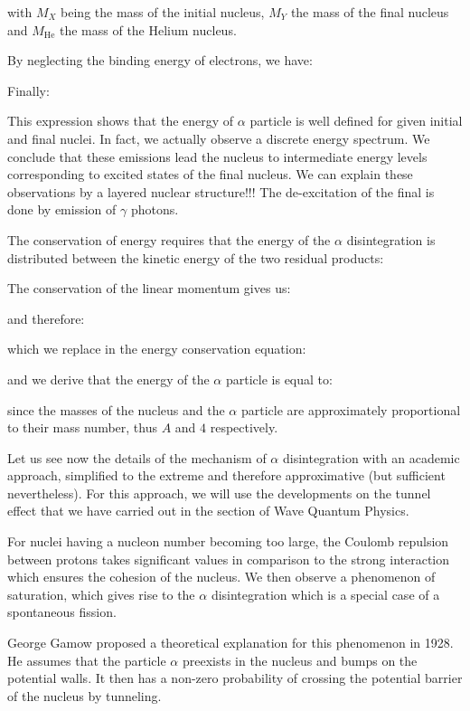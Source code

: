 	with $M_X$ being the mass of the initial nucleus, $M_Y$ the mass of the final nucleus and $M_\text{He}$ the mass of the Helium nucleus.

	By neglecting the binding energy of electrons, we have:
	
	Finally:
	
	This expression shows that the energy of $\alpha$ particle is well defined for given initial and final nuclei. In fact, we actually observe a discrete energy spectrum. We conclude that these emissions lead the nucleus to intermediate energy levels corresponding to excited states of the final nucleus. We can explain these observations by a layered nuclear structure!!! The de-excitation of the final is done by emission of $\gamma$ photons.

	The conservation of energy requires that the energy of the $\alpha$ disintegration is distributed between the kinetic energy of the two residual products:
	
	The conservation of the linear momentum gives us:
	
	and therefore:
	
	which we replace in the energy conservation equation:
	
	and we derive that the energy of the $\alpha$ particle is equal to:
	
	since the masses of the nucleus and the $\alpha$ particle are approximately proportional to their mass number, thus $A$ and $4$ respectively.
	
	Let us see now the details of the mechanism of $\alpha$ disintegration with an academic approach, simplified to the extreme and therefore approximative (but sufficient nevertheless). For this approach, we will use the developments on the tunnel effect that we have carried out in the section of Wave Quantum Physics.

	For nuclei having a nucleon number becoming too large, the Coulomb repulsion between protons takes significant values in comparison to the strong interaction which ensures the cohesion of the nucleus. We then observe a phenomenon of saturation, which gives rise to the $\alpha$ disintegration which is a special case of a spontaneous fission.

	George Gamow proposed a theoretical explanation for this phenomenon in 1928. He assumes that the particle $\alpha$ preexists in the nucleus and bumps on the potential walls. It then has a non-zero probability of crossing the potential barrier of the nucleus by tunneling.

